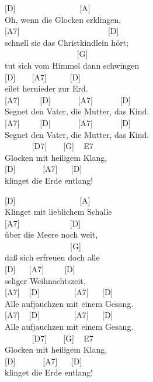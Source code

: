 \documentclass[
  letterpaper,
]{scrbook}
\begin{document}
{[}D{]} ~ ~ ~ ~ ~ ~ ~ ~ ~ {[}A{]}\\
Oh, wenn die Glocken erklingen,\\
{[}A7{]} ~ ~ ~ ~ ~ ~ ~ ~ ~ ~ ~ ~ ~{[}D{]}\\
schnell sie das Christkindlein hört;\\
\hspace*{0.333em} ~ ~ ~ ~ ~ ~ ~ ~ ~ ~ ~{[}G{]}\\
tut sich vom Himmel dann schwingen\\
{[}D{]} ~ ~ {[}A7{]} ~ ~ ~ {[}D{]}\\
eilet hernieder zur Erd\textquotesingle.\\
{[}A7{]} ~ ~ ~{[}D{]} ~ ~ ~ ~{[}A7{]} ~ ~ ~ ~{[}D{]}\\
Segnet den Vater, die Mutter, das Kind.\\
{[}A7{]} ~ ~ ~{[}D{]} ~ ~ ~ ~{[}A7{]} ~ ~ ~ ~{[}D{]}\\
Segnet den Vater, die Mutter, das Kind.\\
\hspace*{0.333em} ~ ~ ~ ~ {[}D7{]} ~ ~ {[}G{]} ~ E7\\
Glocken mit heiligem Klang,\\
{[}D{]} ~ ~ ~ ~{[}A7{]} ~ ~{[}D{]}\\
klinget die Erde entlang!

{[}D{]} ~ ~ ~ ~ ~ ~ ~ ~ ~ {[}A{]}\\
Klinget mit lieblichem Schalle\\
{[}A7{]} ~ ~ ~ ~ ~ ~ ~ {[}D{]}\\
über die Meere noch weit,\\
\hspace*{0.333em} ~ ~ ~ ~ ~ ~ ~ ~ ~ ~{[}G{]}\\
daß sich erfreuen doch alle\\
{[}D{]} ~ ~{[}A7{]} ~ ~ ~{[}D{]}\\
seliger Weihnachtszeit.\\
{[}A7{]} ~ {[}D{]} ~ ~ ~ ~ ~{[}A7{]} ~ ~{[}D{]}\\
Alle aufjauchzen mit einem Gesang.\\
{[}A7{]} ~ {[}D{]} ~ ~ ~ ~ ~{[}A7{]} ~ ~{[}D{]}\\
Alle aufjauchzen mit einem Gesang.\\
\hspace*{0.333em} ~ ~ ~ ~ {[}D7{]} ~ ~ {[}G{]} ~ E7\\
Glocken mit heiligem Klang,\\
{[}D{]} ~ ~ ~ ~{[}A7{]} ~ ~{[}D{]}\\
klinget die Erde entlang!
\end{document}
